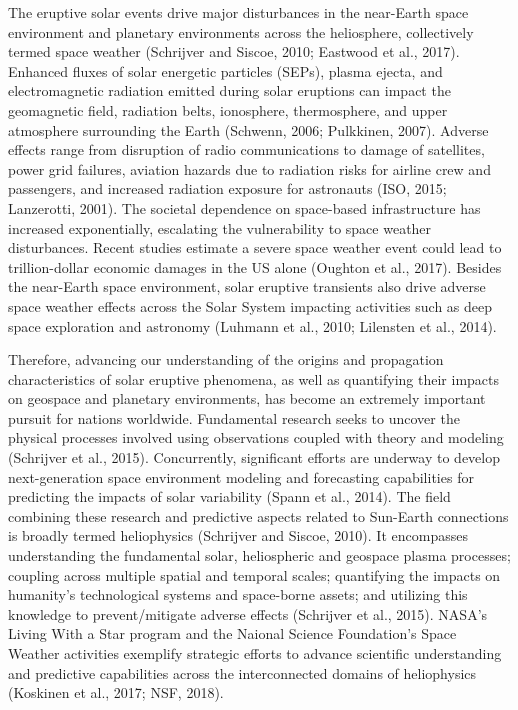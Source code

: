 \documentclass{article}
\begin{document}
The eruptive solar events drive major disturbances in the near-Earth space environment and planetary environments across the heliosphere, collectively termed space weather (Schrijver and Siscoe, 2010; Eastwood et al., 2017). Enhanced fluxes of solar energetic particles (SEPs), plasma ejecta, and electromagnetic radiation emitted during solar eruptions can impact the geomagnetic field, radiation belts, ionosphere, thermosphere, and upper atmosphere surrounding the Earth (Schwenn, 2006; Pulkkinen, 2007). Adverse effects range from disruption of radio communications to damage of satellites, power grid failures, aviation hazards due to radiation risks for airline crew and passengers, and increased radiation exposure for astronauts (ISO, 2015; Lanzerotti, 2001). The societal dependence on space-based infrastructure has increased exponentially, escalating the vulnerability to space weather disturbances. Recent studies estimate a severe space weather event could lead to trillion-dollar economic damages in the US alone (Oughton et al., 2017). Besides the near-Earth space environment, solar eruptive transients also drive adverse space weather effects across the Solar System impacting activities such as deep space exploration and astronomy (Luhmann et al., 2010; Lilensten et al., 2014).

Therefore, advancing our understanding of the origins and propagation characteristics of solar eruptive phenomena, as well as quantifying their impacts on geospace and planetary environments, has become an extremely important pursuit for nations worldwide. Fundamental research seeks to uncover the physical processes involved using observations coupled with theory and modeling (Schrijver et al., 2015). Concurrently, significant efforts are underway to develop next-generation space environment modeling and forecasting capabilities for predicting the impacts of solar variability (Spann et al., 2014). The field combining these research and predictive aspects related to Sun-Earth connections is broadly termed heliophysics (Schrijver and Siscoe, 2010). It encompasses understanding the fundamental solar, heliospheric and geospace plasma processes; coupling across multiple spatial and temporal scales; quantifying the impacts on humanity's technological systems and space-borne assets; and utilizing this knowledge to prevent/mitigate adverse effects (Schrijver et al., 2015). NASA's Living With a Star program and the Naional Science Foundation's Space Weather activities exemplify strategic efforts to advance scientific understanding and predictive capabilities across the interconnected domains of heliophysics (Koskinen et al., 2017; NSF, 2018).
\end{document}
